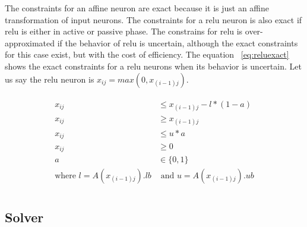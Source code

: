The constraints for an affine neuron are exact because it is just an affine transformation of input neurons. 
The constraints for a relu neuron is also exact if relu is either in active or passive phase. 
The constrains for relu is over-approximated if the behavior of relu is uncertain, although the exact 
constraints for this case exist, but with the cost of efficiency. 
The equation ~\ref{eq:reluexact} shows the exact constraints
for a relu neurons when its behavior is uncertain. Let us say the relu neuron is $x_{ij} = max(0,x_{(i-1)j})$. 

\begin{align}
    \label{eq:reluexact}
    \begin{split}
        x_{ij} &\leq x_{(i-1)j} - l*(1-a) \\
        x_{ij} &\geq x_{(i-1)j} \\
        x_{ij} &\leq u*a \\
        x_{ij} &\geq 0 \\
        a &\in \{0,1\} \\ 
        \text{where }l = A(x_{(i-1)j}).lb &\text{ and }u = A(x_{(i-1)j}).ub \\
    \end{split}
\end{align}


\subsection{Solver}


